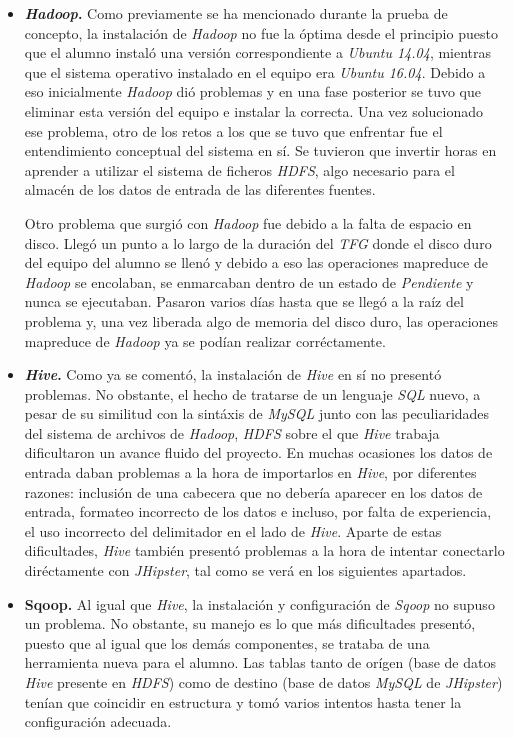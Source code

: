 \begin{itemize}
\item \textbf{\textit{Hadoop}.} Como previamente se ha mencionado durante la prueba de concepto, la instalación de \textit{Hadoop} no fue la óptima desde el principio puesto que el alumno instaló una versión correspondiente a \textit{Ubuntu 14.04}, mientras que el sistema operativo instalado en el equipo era \textit{Ubuntu 16.04}. Debido a eso inicialmente \textit{Hadoop} dió problemas y en una fase posterior se tuvo que eliminar esta versión del equipo e instalar la correcta. Una vez solucionado ese problema, otro de los retos a los que se tuvo que enfrentar fue el entendimiento conceptual del sistema en sí. Se tuvieron que invertir horas en aprender a utilizar el sistema de ficheros \textit{HDFS}, algo necesario para el almacén de los datos de entrada de las diferentes fuentes. 
\par
Otro problema que surgió con \textit{Hadoop} fue debido a la falta de espacio en disco. Llegó un punto a lo largo de la duración del \textit{TFG} donde el disco duro del equipo del alumno se llenó y debido a eso las operaciones \gls{mapreduce} de \textit{Hadoop} se encolaban, se enmarcaban dentro de un estado de \textit{Pendiente} y nunca se ejecutaban. Pasaron varios días hasta que se llegó a la raíz del problema y, una vez liberada algo de memoria del disco duro, las operaciones \gls{mapreduce} de \textit{Hadoop} ya se podían realizar corréctamente. 

\item \textbf{\textit{Hive}.} Como ya se comentó, la instalación de \textit{Hive} en sí no presentó problemas. No obstante, el hecho de tratarse de un lenguaje \textit{SQL} nuevo, a pesar de su similitud con la sintáxis de \textit{MySQL} junto con las peculiaridades del sistema de archivos de \textit{Hadoop}, \textit{HDFS} sobre el que \textit{Hive} trabaja dificultaron un avance fluido del proyecto. En muchas ocasiones los datos de entrada daban problemas a la hora de importarlos en \textit{Hive}, por diferentes razones: inclusión de una cabecera que no debería aparecer en los datos de entrada, formateo incorrecto de los datos e incluso, por falta de experiencia, el uso incorrecto del delimitador en el lado de \textit{Hive}. Aparte de estas dificultades, \textit{Hive} también presentó problemas a la hora de intentar conectarlo diréctamente con \textit{JHipster}, tal como se verá en los siguientes apartados.

\item \textbf{Sqoop.} Al igual que \textit{Hive}, la instalación y configuración de \textit{Sqoop} no supuso un problema. No obstante, su manejo es lo que más dificultades presentó, puesto que al igual que los demás componentes, se trataba de una herramienta nueva para el alumno. Las tablas tanto de orígen (base de datos \textit{Hive} presente en \textit{HDFS}) como de destino (base de datos \textit{MySQL} de \textit{JHipster}) tenían que coincidir en estructura y tomó varios intentos hasta tener la configuración adecuada. 	


\end{itemize}
